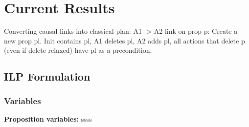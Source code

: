 \documentclass[runningheads]{llncs}
\begin{document}
\section{Current Results}
Converting causal links into classical plan: A1 -> A2 link on prop p: Create a new prop pl. Init contains pl, A1 deletes pl, A2 adds pl, all actions that delete p (even if delete relaxed) have pl as a precondition.\\
\subsection{ILP Formulation}
\subsubsection{Variables}
\textbf{Proposition variables:} ssss\\
\end{document}
